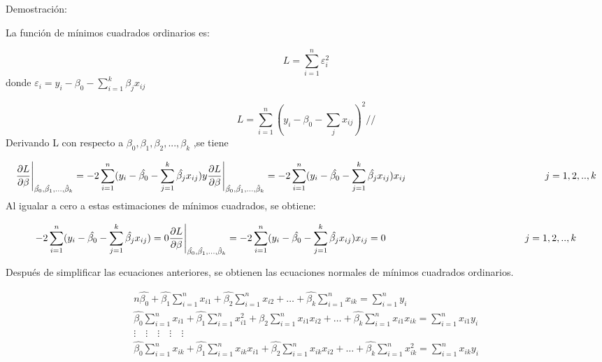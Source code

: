 \documentclass[
]{book}
\begin{document}
Demostración:

La función de mínimos cuadrados ordinarios es:

\[
\begin{equation}
L=\sum_{i=1}^{n}\varepsilon_{i}^2
\end{equation}
\] donde
\(\varepsilon_{i}=y_{i}-\beta_{0}-\sum_{i=1}^{k}\beta_{j}x_{ij}\)

\[
\begin{equation}
L= \sum_{i=1}^n(y_i-\beta_{0}-\sum_{j}x_{ij})^2 //
\end{equation}
\]
Derivando L con respecto a \(\beta_{0},\beta_{1},\beta_{2},...,\beta_{k}\) ,se tiene

\[
\begin{equation}
\frac{\partial L}{\partial \beta} \Bigg|_{\hat{\beta_{0}},\hat{\beta_{1}},...,\hat\beta_{k}}=-2\sum_{i=1}^n(y_{i}-\hat{\beta_{0}}-\sum_{j=1}^k\hat{\beta_{j}}x_{ij}) \\
y \\
\frac{\partial L}{\partial \beta} \Bigg|_{\hat{\beta_{0}},\hat{\beta_{1}},...,\hat\beta_{k}}=-2\sum_{i=1}^n(y_{i}-\hat{\beta_{0}}-\sum_{j=1}^k\hat{\beta_{j}}x_{ij})x_{ij} \hspace{5.0cm} j =1,2,..,k
\end{equation}
\]
Al igualar a cero a estas estimaciones de mínimos cuadrados, se obtiene:

\[
\begin{equation}
-2\sum_{i=1}^n(y_{i}-\hat{\beta_{0}}-\sum_{j=1}^k\hat{\beta_{j}}x_{ij})=0 \\
\frac{\partial L}{\partial \beta} \Bigg|_{\hat{\beta_{0}},\hat{\beta_{1}},...,\hat\beta_{k}}=-2\sum_{i=1}^n(y_{i}-\hat{\beta_{0}}-\sum_{j=1}^k\hat{\beta_{j}}x_{ij})x_{ij}=0 \hspace{5.0cm} j =1,2,..,k
\end{equation}
\]

Después de simplificar las ecuaciones anteriores, se obtienen las ecuaciones normales de mínimos cuadrados ordinarios.

\[
\begin{equation}
\begin{matrix}
n\hat{\beta_{0}} + \hat{\beta_{1}}\sum_{i=1}^nx_{i1} + \hat{\beta_{2}}\sum_{i=1}^nx_{i2} + \ldots + \hat{\beta_{k}}\sum_{i=1}^nx_{ik} = \sum_{i=1}^ny_i \\
\hat{\beta_{0}}\sum_{i=1}^nx_{i1} + \hat{\beta_{1}}\sum_{i=1}^nx_{i1}^2 + \hat{\beta_{2}}\sum_{i=1}^nx_{i1}x_{i2} + \ldots + \hat{\beta_{k}}\sum_{i=1}^nx_{i1}x_{ik} = \sum_{i=1}^nx_{i1}y_i \\
\vdots \quad \vdots \quad \vdots \quad \vdots \quad \vdots \\
\hat{\beta_{0}}\sum_{i=1}^nx_{ik} + \hat{\beta_{1}}\sum_{i=1}^nx_{ik}x_{i1} + \hat{\beta_{2}}\sum_{i=1}^nx_{ik}x_{i2} + \ldots + \hat{\beta_{k}}\sum_{i=1}^nx_{ik}^2 = \sum_{i=1}^nx_{ik}y_i
\end{matrix}
\end{equation}
\]
\end{document}
